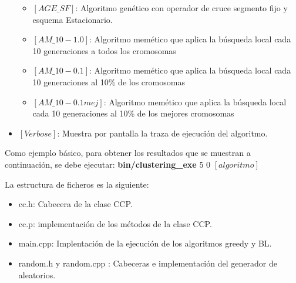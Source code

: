 \begin{itemize}
\begin{itemize}
      \item $[AGE\_SF]$: Algoritmo genético con operador de cruce segmento fijo y esquema Estacionario.
      \item $[AM\_10-1.0]$: Algoritmo memético que aplica la búsqueda local cada 10 generaciones a todos los cromosomas
      \item $[AM\_10-0.1]$: Algoritmo memético que aplica la búsqueda local cada 10 generaciones al 10\% de los cromosomas
      \item $[AM\_10-0.1mej]$: Algoritmo memético que aplica la búsqueda local cada 10 generaciones al 10\% de los mejores cromosomas
   \end{itemize}
   \item $[Verbose]$: Muestra por pantalla la traza de ejecución del algoritmo.
\end{itemize}

Como ejemplo básico, para obtener los resultados que se muestran a continuación, se debe ejecutar: \textbf{bin/clustering\_exe} 5 0 $[algoritmo]$

La estructura de ficheros es la siguiente:
\begin{itemize}
   \item cc.h: Cabecera de la clase CCP.
   \item cc.p: implementación de los métodos de la clase CCP.
   \item main.cpp: Implentación de la ejecución de los algoritmos greedy y BL.
   \item random.h y random.cpp : Cabeceras e implementación del generador de aleatorios.
\end{itemize}
